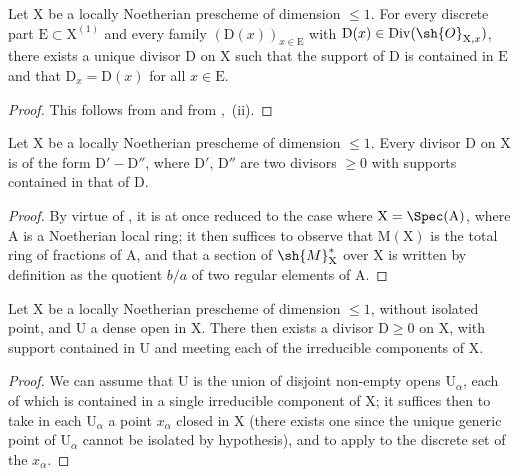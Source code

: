 \begin{corollary}[21.9.5]
\label{IV.21.9.5}
Let $\mathrm{X}$ be a locally Noetherian prescheme of dimension $\leq 1$.
For every discrete part $\mathrm{E}\subset\mathrm{X}^{(1)}$ and every family $(\mathrm{D}(x))_{x\in\mathrm{E}}$ with $\mathrm{D}(x)\in\operatorname{Div}(\sh{O}_{\mathrm{X},x})$, there exists a unique divisor $\mathrm{D}$ on $\mathrm{X}$ such that the support of $\mathrm{D}$ is contained in $\mathrm{E}$ and that $\mathrm{D}_x=\mathrm{D}(x)$ for all $x\in\mathrm{E}$.
\end{corollary}

\begin{proof}
This follows from  and from ,{}~(ii).
\end{proof}

\begin{corollary}[21.9.6]
\label{IV.21.9.6}
Let $\mathrm{X}$ be a locally Noetherian prescheme of dimension $\leq 1$.
Every divisor $\mathrm{D}$ on $\mathrm{X}$ is of the form $\mathrm{D}'-\mathrm{D}''$, where $\mathrm{D}'$, $\mathrm{D}''$ are two divisors $\geq 0$ with supports contained in that of $\mathrm{D}$.
\end{corollary}

\begin{proof}
By virtue of , it is at once reduced to the case where $\mathrm{X}=\Spec(\mathrm{A})$, where $\mathrm{A}$ is a Noetherian local ring;
it then suffices to observe that $\mathrm{M}(\mathrm{X})$ is the total ring of fractions of $\mathrm{A}$, and that a section of $\sh{M}^*_\mathrm{X}$ over $\mathrm{X}$ is written by definition as the quotient $b/a$ of two regular elements of $\mathrm{A}$.
\end{proof}

\begin{corollary}[21.9.7]
\label{IV.21.9.7}
Let $\mathrm{X}$ be a locally Noetherian prescheme of dimension $\leq 1$, without isolated point, and $\mathrm{U}$ a dense open in $\mathrm{X}$.
There then exists a divisor $\mathrm{D}\geq 0$ on $\mathrm{X}$, with support contained in $\mathrm{U}$ and meeting each of the irreducible components of $\mathrm{X}$.
\end{corollary}

\begin{proof}
We can assume that $\mathrm{U}$ is the union of disjoint non-empty opens $\mathrm{U}_\alpha$, each of which is contained in a single irreducible component of $\mathrm{X}$;
it suffices then to take in each $\mathrm{U}_\alpha$ a point $x_\alpha$ closed in $\mathrm{X}$ (there exists one since the unique generic point of $\mathrm{U}_\alpha$ cannot be isolated by hypothesis), and to apply  to the discrete set of the $x_\alpha$.
\end{proof}

